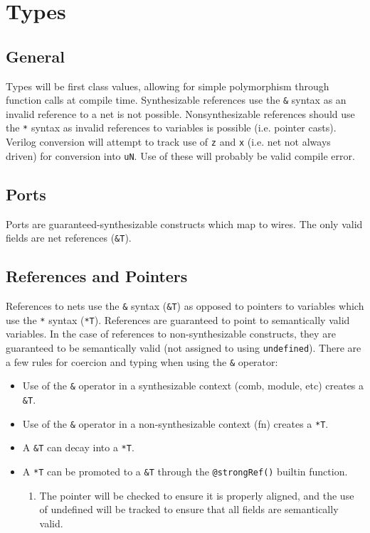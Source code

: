 \documentclass[10pt]{article}
\begin{document}
\section{Types}

\subsection{General}
Types will be first class values, allowing for simple polymorphism through function calls at compile
time. Synthesizable references use the \verb|&| syntax as an invalid reference to a net is not possible.
Nonsynthesizable references should use the \verb|*| syntax as invalid references to variables is possible
(i.e. pointer casts). Verilog conversion will attempt to track use of \verb|z| and \verb|x| (i.e.
net not always driven) for conversion into \verb|uN|. Use of these will probably be valid compile
error.

\subsection{Ports}
Ports are guaranteed-synthesizable constructs which map to wires. The only valid fields are net
references (\verb|&T|).

\subsection{References and Pointers}
References to nets use the \verb|&| syntax (\verb|&T|) as opposed to pointers to variables which use
the \verb|*| syntax (\verb|*T|). References are guaranteed to point to semantically valid variables.
In the case of references to non-synthesizable constructs, they are guaranteed to be semantically
valid (not assigned to using \verb|undefined|). There are a few rules for coercion and typing when using the
\verb|&| operator:

\begin{itemize}
	\item Use of the \verb|&| operator in a synthesizable context (comb, module, etc) creates a \verb|&T|.
	\item Use of the \verb|&| operator in a non-synthesizable context (fn) creates a \verb|*T|.
	\item A \verb|&T| can decay into a \verb|*T|.
	\item A \verb|*T| can be promoted to a \verb|&T| through the \verb|@strongRef()| builtin function.
	      \begin{enumerate}
		      \item The pointer will be checked to ensure it is properly aligned, and the use of undefined
		            will be tracked to ensure that all fields are semantically valid.
	      \end{enumerate}
\end{itemize}
\end{document}
